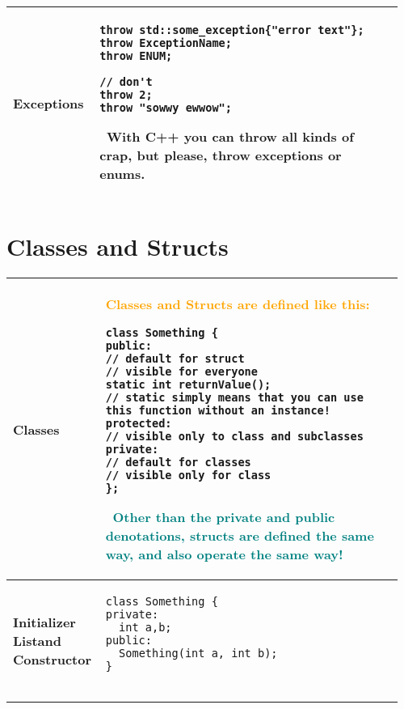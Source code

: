 \documentclass[main.tex,fontsize=8pt,paper=a4,paper=portrait,DIV=calc,]{scrartcl}
\begin{document}
\begin{table}[ht!]
\begin{tabular}{|m{0.2\linewidth}|m{0.755\linewidth}|}
\\
\hline
Exceptions & 
\begin{lstlisting}
throw std::some_exception{"error text"};
throw ExceptionName;
throw ENUM;

// don't
throw 2;
throw "sowwy ewwow";
\end{lstlisting}
\, \newline
With C++ you can throw all kinds of crap, but please, throw exceptions or enums.\\
\hline
\end{tabular}
\end{table}
\pagebreak
\begin{table}[ht!]
\section{Classes and Structs}
\begin{tabular}{|m{0.2\linewidth}|m{0.755\linewidth}|}
\hline
Classes &
\textcolor{orange}{Classes and Structs are defined like this:}\newline
\begin{lstlisting}
class Something { 
public:
// default for struct
// visible for everyone
static int returnValue();
// static simply means that you can use this function without an instance!
protected:
// visible only to class and subclasses
private:
// default for classes
// visible only for class
};
\end{lstlisting}
\, \newline
\textcolor{teal}{Other than the private and public denotations, structs are defined the same way, and also operate the same way!}\\
\hline
\textbf{Initializer List\newline and Constructor} & 
\begin{lstlisting}
class Something {
private:
  int a,b;
public:
  Something(int a, int b);
}


\end{lstlisting}
\end{tabular}
\end{table}
\end{document}

